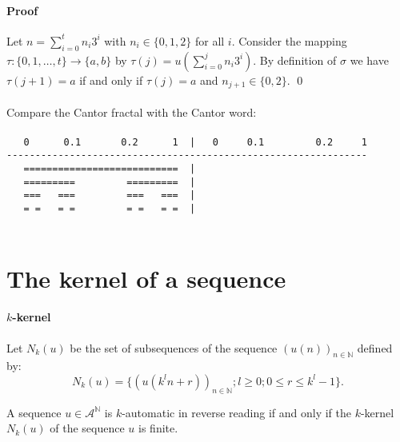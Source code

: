 \documentclass{article}
\begin{document}
\paragraph{Proof} Let $n = \sum_{i = 0}^t n_i 3^i$ with $n_i \in \{0, 1, 2\}$
for all $i$. Consider the mapping 
$\tau: \{0, 1, \ldots, t\} \to \{a, b\}$
by $\tau(j) = u(\sum_{i = 0}^j n_i 3^i)$. By definition of $\sigma$ we have 
$\tau(j + 1) = a$ if and only if $\tau(j) = a$ and $n_{j + 1} \in \{0, 2\}$.
\qed\\
\\
Compare the Cantor fractal with the Cantor word:\\
\\
\verb#   0      0.1       0.2      1  |   0     0.1         0.2     1#\\
\verb#---------------------------------------------------------------#\\
\verb#   ===========================  |               #\\
\verb#   =========         =========  |      # { } { } { } { } { } { } { } { } { } { } { } { }\\
\verb#   ===   ===         ===   ===  |   #\\
\verb#   = =   = =         = =   = =  |  #\\
\\

\section*{The kernel of a sequence}
\paragraph{$k$-kernel} Let $N_k(u)$ be the set of subsequences of the sequence
$(u(n))_{n \in \mathbb{N}}$ defined by:
\begin{displaymath}
N_k(u) = \{(u(k^ln + r))_{n \in \mathbb{N}}; l \ge 0; 0 \le r \le k^l - 1\}.
\end{displaymath}

\begin{automata}
A sequence $u \in \mathcal{A}^\mathbb{N}$ is $k$-automatic in reverse reading 
if and only if the $k$-kernel $N_k(u)$ of the sequence $u$ is finite.
\end{automata}
\end{document}
